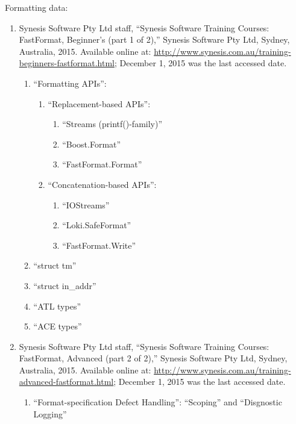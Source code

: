 Formatting data: \vspace{-0.3cm}
\begin{enumerate} \itemsep -4pt
\item Synesis Software Pty Ltd staff, ``Synesis Software Training Courses: FastFormat, Beginner's (part 1 of 2),'' Synesis Software Pty Ltd, Sydney, Australia, 2015.  Available online at: \url{http://www.synesis.com.au/training-beginners-fastformat.html}; December 1, 2015 was the last accessed date. \vspace{-0.3cm}
	\begin{enumerate} \itemsep -2pt
	\item ``Formatting APIs'': \vspace{-0.2cm}
		\begin{enumerate} \itemsep -2pt
		\item ``Replacement-based APIs'': \vspace{-0.1cm}
			\begin{enumerate} \itemsep -1pt
			\item ``Streams (printf()-family)''
			\item ``Boost.Format''
			\item ``FastFormat.Format''
			\end{enumerate}
		\item ``Concatenation-based APIs'': \vspace{-0.1cm}
			\begin{enumerate} \itemsep -1pt
			\item ``IOStreams''
			\item ``Loki.SafeFormat''
			\item ``FastFormat.Write''
			\end{enumerate}
		\end{enumerate}
	\item ``struct tm''
	\item ``struct in\_addr''	%
	\item ``ATL types''
	\item ``ACE types''
	\end{enumerate}
\item Synesis Software Pty Ltd staff, ``Synesis Software Training Courses: FastFormat, Advanced (part 2 of 2),'' Synesis Software Pty Ltd, Sydney, Australia, 2015.  Available online at: \url{http://www.synesis.com.au/training-advanced-fastformat.html}; December 1, 2015 was the last accessed date. \vspace{-0.3cm}
	\begin{enumerate} \itemsep -2pt
	\item ``Format-specification Defect Handling'': ``Scoping'' and ``Disgnostic Logging''
	\end{enumerate}
\end{enumerate}



